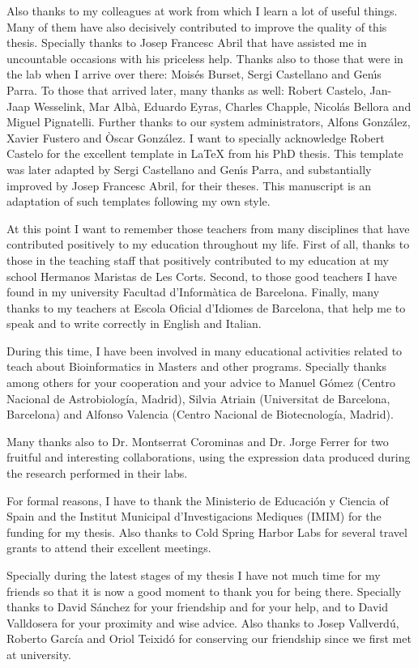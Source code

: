 Also thanks to my colleagues at work from which I learn a lot of useful things.
Many of them have also decisively contributed to improve the quality of this thesis.
Specially thanks to Josep Francesc Abril that have assisted me in uncountable
occasions with his priceless help. Thanks also to those that were in the lab when I
arrive over there: Mois\'es Burset, Sergi Castellano and Gen\'{\i}s Parra. To those
that arrived later, many thanks as well: Robert Castelo, Jan-Jaap Wesselink,
Mar Alb\`a, Eduardo Eyras, Charles Chapple, Nicol\'as Bellora and Miguel Pignatelli.
Further thanks to our system administrators, Alfons Gonz\'alez, Xavier Fustero
and \`Oscar Gonz\'alez. I want to specially acknowledge Robert Castelo for
the excellent template in \LaTeX{} from his PhD thesis. This template was
later adapted by Sergi Castellano and Gen\'{\i}s Parra, and substantially
improved by Josep Francesc Abril, for their theses. This manuscript is an
adaptation of such templates following my own style.

At this point I want to remember those teachers from many disciplines that have
contributed positively to my education throughout my life. First of all, thanks to
those in the teaching staff that positively contributed to my education at my school
Hermanos Maristas de Les Corts. Second, to those good teachers I have found in my
university Facultad d'Inform\`atica de Barcelona. Finally, many thanks to my teachers
at Escola Oficial d'Idiomes de Barcelona, that help me to speak and to write correctly
in English and Italian.

During this time, I have been involved in many educational activities related
to teach about Bioinformatics in Masters and other programs. Specially thanks among others
for your cooperation and your advice to Manuel G\'omez (Centro Nacional de
Astrobiolog\'ia, Madrid), Silvia Atriain (Universitat de Barcelona, Barcelona) and
Alfonso Valencia (Centro Nacional de Biotecnolog\'ia, Madrid).

Many thanks also to Dr. Montserrat Corominas and Dr. Jorge Ferrer for two fruitful and interesting
collaborations, using the expression data produced during the research performed in their labs.

For formal reasons, I have to thank the Ministerio de Educaci\'on y Ciencia of Spain
and the Institut Municipal d'Investigacions Mediques (IMIM) for the funding for my
thesis. Also thanks to Cold Spring Harbor Labs for several travel grants to attend
their excellent meetings.

Specially during the latest stages of my thesis I have not much time for my friends
so that it is now a good moment to thank you for being there. Specially thanks to David
S\'anchez for your friendship and for your help, and to David Valldosera for your
proximity and wise advice. Also thanks to Josep Vallverd\'u, Roberto Garc\'ia
and Oriol Teixid\'o for conserving our friendship since we first met at university.

